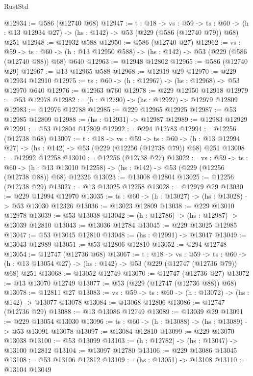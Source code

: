 \begin{lexlean}{RustStd}
\begin{coremodule}
@12934 := @586 (@12740 @68)
@12947 := {t : @18} ->
  {vs : @59} ->
  {ts : @60} -> (h : @13 @12934 @27) -> (hs : @142) -> @53 (@229 (@586 (@12740 @79)) @68) @251
@12948 := @12932 @588
@12950 := @586 (@12740 @27)
@12962 := {vs : @59} ->
  {ts : @60} -> (h : @13 @12950 @588) -> (hs : @142) -> @53 (@229 (@586 (@12740 @88)) @68) @640
@12963 := @12948 @12802
@12965 := @586 (@12740 @29)
@12967 := @13 @12965 @588
@12968 := @12919 @29
@12970 := @229 @12934 @12910
@12975 := {ts : @60} -> (h : @12967) -> (hs : @12968) -> @53 @12970 @640
@12976 := @12963 @760
@12978 := @229 @12950 @12918
@12979 := @53 @12978
@12982 := (h : @12790) -> (hs : @12927) -> @12979 @12809
@12983 := @12976 @12788
@12985 := @229 @12965 @12925
@12987 := @53 @12985 @12809
@12988 := (hs : @12931) -> @12987
@12989 := @12983 @12929
@12991 := @53 @12804 @12809
@12992 := @294 @12783
@12994 := @12256 (@12738 @68)
@13007 := {t : @18} ->
  {vs : @59} ->
  {ts : @60} -> (h : @13 @12994 @27) -> (hs : @142) -> @53 (@229 (@12256 (@12738 @79)) @68) @251
@13008 := @12992 @12258
@13010 := @12256 (@12738 @27)
@13022 := {vs : @59} ->
  {ts : @60} ->
  (h : @13 @13010 @12258) -> (hs : @142) -> @53 (@229 (@12256 (@12738 @88)) @68) @12326
@13023 := @13008 @12804
@13025 := @12256 (@12738 @29)
@13027 := @13 @13025 @12258
@13028 := @12979 @29
@13030 := @229 @12994 @12970
@13035 := {ts : @60} -> (h : @13027) -> (hs : @13028) -> @53 @13030 @12326
@13036 := @13023 @12809
@13038 := @229 @13010 @12978
@13039 := @53 @13038
@13042 := (h : @12786) -> (hs : @12987) -> @13039 @12810
@13043 := @13036 @12784
@13045 := @229 @13025 @12985
@13047 := @53 @13045 @12810
@13048 := (hs : @12991) -> @13047
@13049 := @13043 @12989
@13051 := @53 @12806 @12810
@13052 := @294 @12748
@13054 := @12747 (@12736 @68)
@13067 := {t : @18} ->
  {vs : @59} ->
  {ts : @60} -> (h : @13 @13054 @27) -> (hs : @142) -> @53 (@229 (@12747 (@12736 @79)) @68) @251
@13068 := @13052 @12749
@13070 := @12747 (@12736 @27)
@13072 := @13 @13070 @12749
@13077 := @53 (@229 (@12747 (@12736 @88)) @68)
@13078 := @12811 @27
@13083 := {vs : @59} -> {ts : @60} -> (h : @13072) -> (hs : @142) -> @13077 @13078
@13084 := @13068 @12806
@13086 := @12747 (@12736 @29)
@13088 := @13 @13086 @12749
@13089 := @13039 @29
@13091 := @229 @13054 @13030
@13096 := {ts : @60} -> (h : @13088) -> (hs : @13089) -> @53 @13091 @13078
@13097 := @13084 @12810
@13099 := @229 @13070 @13038
@13100 := @53 @13099
@13103 := (h : @12782) -> (hs : @13047) -> @13100 @12812
@13104 := @13097 @12780
@13106 := @229 @13086 @13045
@13108 := @53 @13106 @12812
@13109 := (hs : @13051) -> @13108
@13110 := @13104 @13049

\end{coremodule}
\end{lexlean}
